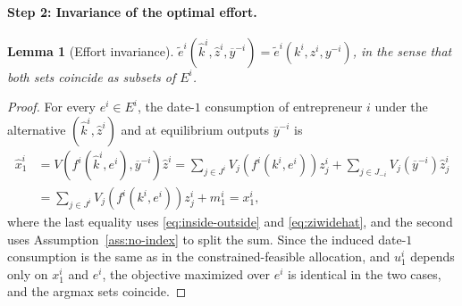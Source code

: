 \documentclass[11pt,a4paper,oneside]{book}
\theoremstyle{plain}
\newtheorem{lemma}[theorem]{Lemma}
\theoremstyle{definition}
\theoremstyle{remark}
\numberwithin{equation}{chapter}
\begin{document}
\paragraph{Step 2: Invariance of the optimal effort.}

\begin{lemma}[Effort invariance]\label{lem:effort-invariance}
$\widetilde{e}^i(\widehat{k}^i, \widehat{z}^i, \overline{y}^{-i}) = \widetilde{e}^i(k^i, z^i, y^{-i})$, in the sense that both sets coincide as subsets of $E^i$.
\end{lemma}

\begin{proof}
For every $e^i \in E^i$, the date-$1$ consumption of entrepreneur $i$ under the alternative $(\widehat{k}^i, \widehat{z}^i)$ and at equilibrium outputs $\overline{y}^{-i}$ is
\begin{align*}
  \widehat{x}^i_1
  &= V(f^i(\widehat{k}^i, e^i), \overline{y}^{-i}) \widehat{z}^i
  = \sum_{j \in J^i} V_j(f^i(k^i, e^i)) z^i_j + \sum_{j \in J_{-i}} V_j(\overline{y}^{-i}) \widehat{z}^i_j \\
  &= \sum_{j \in J^i} V_j(f^i(k^i, e^i)) z^i_j + m^i_1
  = x^i_1,
\end{align*}
where the last equality uses \eqref{eq:inside-outside} and \eqref{eq:ziwidehat}, and the second uses Assumption~\ref{ass:no-index} to split the sum.
Since the induced date-$1$ consumption is the same as in the constrained-feasible allocation, and $u^i_1$ depends only on $x^i_1$ and $e^i$, the objective maximized over $e^i$ is identical in the two cases, and the argmax sets coincide.
\end{proof}
\end{document}
